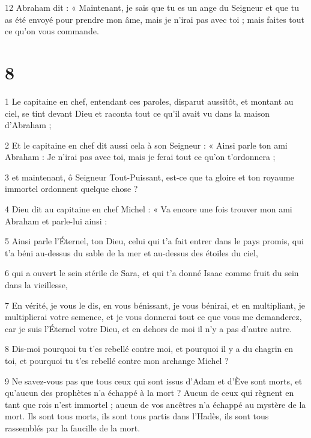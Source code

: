 \par 12 Abraham dit : « Maintenant, je sais que tu es un ange du Seigneur et que tu as été envoyé pour prendre mon âme, mais je n'irai pas avec toi ; mais faites tout ce qu’on vous commande.

\chapter{8}

\par 1 Le capitaine en chef, entendant ces paroles, disparut aussitôt, et montant au ciel, se tint devant Dieu et raconta tout ce qu'il avait vu dans la maison d'Abraham ;

\par 2 Et le capitaine en chef dit aussi cela à son Seigneur : « Ainsi parle ton ami Abraham : Je n'irai pas avec toi, mais je ferai tout ce qu'on t'ordonnera ;

\par 3 et maintenant, ô Seigneur Tout-Puissant, est-ce que ta gloire et ton royaume immortel ordonnent quelque chose ?

\par 4 Dieu dit au capitaine en chef Michel : « Va encore une fois trouver mon ami Abraham et parle-lui ainsi :

\par 5 Ainsi parle l'Éternel, ton Dieu, celui qui t'a fait entrer dans le pays promis, qui t'a béni au-dessus du sable de la mer et au-dessus des étoiles du ciel,

\par 6 qui a ouvert le sein stérile de Sara, et qui t'a donné Isaac comme fruit du sein dans la vieillesse,

\par 7 En vérité, je vous le dis, en vous bénissant, je vous bénirai, et en multipliant, je multiplierai votre semence, et je vous donnerai tout ce que vous me demanderez, car je suis l'Éternel votre Dieu, et en dehors de moi il n'y a pas d'autre autre.

\par 8 Dis-moi pourquoi tu t'es rebellé contre moi, et pourquoi il y a du chagrin en toi, et pourquoi tu t'es rebellé contre mon archange Michel ?

\par 9 Ne savez-vous pas que tous ceux qui sont issus d'Adam et d'Ève sont morts, et qu'aucun des prophètes n'a échappé à la mort ? Aucun de ceux qui règnent en tant que rois n’est immortel ; aucun de vos ancêtres n’a échappé au mystère de la mort. Ils sont tous morts, ils sont tous partis dans l’Hadès, ils sont tous rassemblés par la faucille de la mort.

